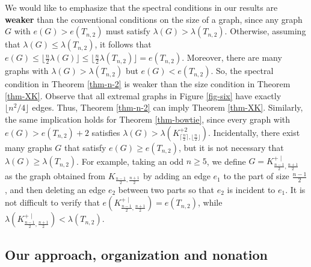 \documentclass[11pt]{article}
\begin{document}
\medskip 

We would like to emphasize that 
the spectral conditions in our results are {\bf weaker} than 
the conventional conditions on the size of a graph, since  
any graph $G$ with $e(G)>  e(T_{n,2})$ 
must satisfy $\lambda (G)> \lambda (T_{n,2})$.  
Otherwise, assuming that $\lambda (G) \le \lambda (T_{n,2})$, 
it follows that $e(G)\le \lfloor \frac{n}{2} \lambda (G)\rfloor \le 
\lfloor \frac{n}{2} \lambda (T_{n,2})\rfloor = e(T_{n,2})$.   
Moreover, there are many graphs with $\lambda (G)> \lambda (T_{n,2})$ 
but $e(G)< e(T_{n,2})$. 
So, the spectral condition in Theorem \ref{thm-n-2} is weaker than 
the size condition in Theorem \ref{thm-XK}. 
Observe that all extremal graphs in Figure \ref{fig-six} have exactly $\lfloor n^2/4\rfloor$ edges. Thus, Theorem \ref{thm-n-2} 
can imply Theorem \ref{thm-XK}. 
Similarly, the same implication holds for Theorem \ref{thm-bowtie},   
since every graph with $e(G)> e(T_{n,2}) +2$ satisfies 
$ \lambda (G) > \lambda (K_{\lceil \frac{n}{2} \rceil, \lfloor \frac{n}{2} \rfloor}^{+2})$. 
Incidentally, there exist many graphs $G$ that satisfy $e(G)\ge e(T_{n,2})$, 
but it is not necessary that $\lambda (G)\ge \lambda (T_{n,2})$. 
For example, 
taking an odd $n\ge 5$,  we define  
$G=K_{\frac{n-1}{2}, \frac{n+1}{2}}^{+\,\,|}$ as the graph obtained  from 
$K_{ \frac{n-1}{2},  \frac{n+1}{2}}$ by adding an edge $e_1$ to the part of size $ \frac{n-1}{2} $, and then deleting an edge $e_2$ between two parts so that $e_2$ is incident to $e_1$. 
It is not difficult to verify that $e(K_{\frac{n-1}{2}, \frac{n+1}{2}}^{+\,\,|}) = 
e(T_{n,2})$, while 
$\lambda (K_{\frac{n-1}{2}, \frac{n+1}{2}}^{+\,\,|}) < \lambda (T_{n,2})$. 


\subsection{Our approach, organization and nonation}
\end{document}
